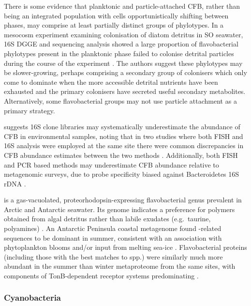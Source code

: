 There is some evidence that planktonic and particle-attached \ac{CFB}, rather than being an integrated population with cells opportunistically shifting between phases, may comprise at least partially distinct groups of phylotypes.
In a mesocosm experiment examining colonisation of diatom detritus in \ac{SO} seawater, 16S \ac{DGGE} and sequencing analysis showed a large proportion of flavobacterial phylotypes present in the planktonic phase failed to colonise detrital particles during the course of the experiment \cite{Abell:2005dh}.
The authors suggest these phylotypes may be slower-growing, perhaps comprising a secondary group of colonisers which only come to dominate when the more accessible detrital nutrients have been exhausted and the primary colonisers have secreted useful secondary metabolites.
Alternatively, some flavobacterial groups may not use particle attachment as a primary strategy.

\citet{Kirchman:2002ub} suggests 16S clone libraries may systematically underestimate the abundance of \ac{CFB} in environmental samples, noting that in two studies where both \ac{FISH} and 16S analysis were employed at the same site there were common discrepancies in \ac{CFB} abundance estimates between the two methods \cite{Cottrell:2000iq,Eilers:2000in}.
Additionally, both \ac{FISH} and PCR based methods may underestimate \ac{CFB} abundance relative to metagenomic surveys, due to probe specificity biased against Bacteroidetes 16S rDNA \cite{Cottrell:2005bo,OSullivan:2006km}.

 is a gas-vacuolated, proteorhodopsin-expressing flavobacterial genus prevalent in Arctic and Antarctic seawater.
Its genome indicates a preference for polymers obtained from algal detritus rather than labile exudates (e.g.\ taurine, polyamines) \cite{Gonzalez:2008tn}.
An Antarctic Peninsula coastal metagenome found -related sequences to be dominant in summer, consistent with an association with phytoplankton blooms and/or input from melting sea-ice \cite{Grzymski:2012ej}.
Flavobacterial proteins (including those with the best matches to  spp.) were similarly much more abundant in the summer than winter metaproteome from the same sites, with components of TonB-dependent receptor systems predominating \cite{Williams:2012bs}. 

\subsubsection{Cyanobacteria}

